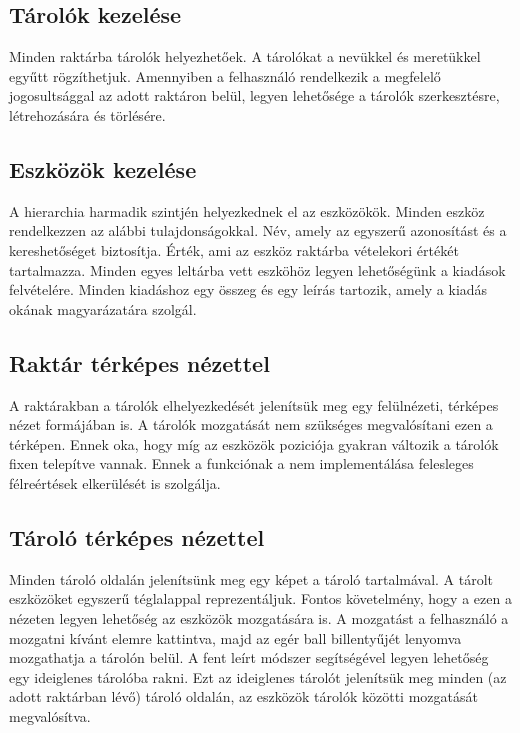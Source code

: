 \subsection{Tárolók kezelése}
Minden raktárba tárolók helyezhetőek. A tárolókat a nevükkel és meretükkel egyűtt rögzíthetjuk.
Amennyiben a felhasználó rendelkezik a megfelelő jogosultsággal az adott raktáron belül, legyen lehetősége a tárolók szerkesztésre, létrehozására és törlésére.

\subsection{Eszközök kezelése}
A hierarchia harmadik szintjén helyezkednek el az eszközökök. 
Minden eszköz rendelkezzen az alábbi tulajdonságokkal.
Név, amely az egyszerű azonosítást és a kereshetőséget biztosítja.
Érték, ami az eszköz raktárba vételekori értékét tartalmazza.
Minden egyes leltárba vett eszköhöz legyen lehetőségünk a kiadások felvételére.
Minden kiadáshoz egy összeg és egy leírás tartozik, amely a kiadás okának magyarázatára szolgál.

\subsection{Raktár térképes nézettel}
A raktárakban a tárolók elhelyezkedését jelenítsük meg egy felülnézeti, térképes nézet formájában is.
A tárolók mozgatását nem szükséges megvalósítani ezen a térképen.
Ennek oka, hogy míg az eszközök poziciója gyakran változik a tárolók fixen telepítve vannak.
Ennek a funkciónak a nem implementálása felesleges félreértések elkerülését is szolgálja.

\subsection{Tároló térképes nézettel}
Minden tároló oldalán jelenítsünk meg egy képet a tároló tartalmával.
A tárolt eszközöket egyszerű téglalappal reprezentáljuk.
Fontos követelmény, hogy a ezen a nézeten legyen lehetőség az eszközök mozgatására is.
A mozgatást a felhasználó a mozgatni kívánt elemre kattintva, majd az egér ball billentyűjét lenyomva mozgathatja a tárolón belül.
A fent leírt módszer segítségével legyen lehetőség egy ideiglenes tárolóba rakni. 
Ezt az ideiglenes tárolót jelenítsük meg minden (az adott raktárban lévő) tároló oldalán, az eszközök tárolók közötti mozgatását megvalósítva.

